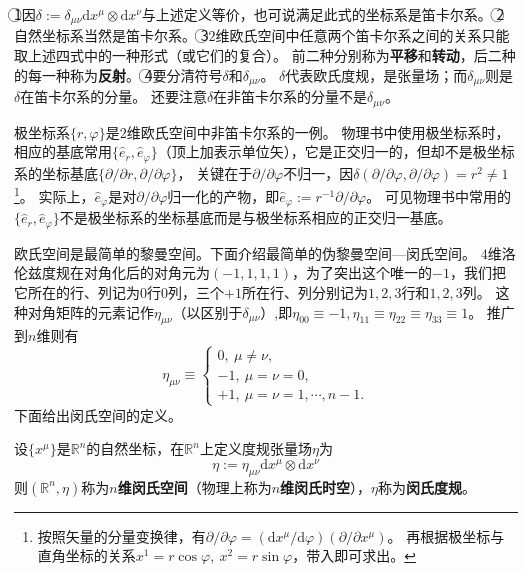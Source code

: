 \begin{note}
\textcircled{1}因$\delta := \delta_{\mu\nu}\mathrm{d}x^\mu\otimes\mathrm{d}x^\nu$与上述定义等价，也可说满足此式的坐标系是笛卡尔系。
\textcircled{2}自然坐标系当然是笛卡尔系。
\textcircled{3}$2$维欧氏空间中任意两个笛卡尔系之间的关系只能取上述四式中的一种形式（或它们的复合）。
前二种分别称为\textbf{平移}和\textbf{转动}，后二种的每一种称为\textbf{反射}。
\textcircled{4}要分清符号$\delta$和$\delta_{\mu\nu}$。
$\delta$代表欧氏度规，是张量场；而$\delta_{\mu\nu}$则是$\delta$在笛卡尔系的分量。
还要注意$\delta$在非笛卡尔系的分量不是$\delta_{\mu\nu}$。
\end{note}

极坐标系$\{r, \varphi\}$是$2$维欧氏空间中非笛卡尔系的一例。
物理书中使用极坐标系时，相应的基底常用$\{\hat{e}_r, \hat{e}_\varphi\}$（顶上加$\hat{}$表示单位矢），它是正交归一的，但却不是极坐标系的坐标基底$\{\partial / \partial r, \partial / \partial\varphi\}$，
关键在于$\partial / \partial\varphi$不归一，因$\delta(\partial / \partial\varphi, \partial / \partial\varphi) = r^2 \neq 1$\footnote{
按照矢量的分量变换律，有$\partial / \partial\varphi = (\mathrm{d}x^\mu / \mathrm{d}\varphi)(\partial / \partial x^\mu)$。
再根据极坐标与直角坐标的关系$x^1 = r\cos\varphi, ~ x^2 = r\sin\varphi$，带入即可求出。
}。
实际上，$\hat{e}_\varphi$是对$\partial / \partial\varphi$归一化的产物，即$\hat{e}_\varphi := r^{-1}\partial / \partial\varphi$。
可见物理书中常用的$\{\hat{e}_r, \hat{e}_\varphi\}$不是极坐标系的坐标基底而是与极坐标系相应的正交归一基底。

欧氏空间是最简单的黎曼空间。下面介绍最简单的伪黎曼空间---闵氏空间。
$4$维洛伦兹度规在对角化后的对角元为$(-1, 1, 1, 1)$，为了突出这个唯一的$-1$，我们把它所在的行、列记为$0$行$0$列，三个$+1$所在行、列分别记为$1, 2, 3$行和$1, 2, 3$列。
这种对角矩阵的元素记作$\eta_{\mu\nu}$（以区别于$\delta_{\mu\nu}$）,即$\eta_{00} \equiv -1, \eta_{11} \equiv \eta_{22} \equiv \eta_{33} \equiv 1$。
推广到$n$维则有
$$
\eta_{\mu\nu} \equiv
\begin{cases}
0, ~ \mu \neq \nu, \\
-1, ~ \mu = \nu = 0, \\
+1, ~ \mu = \nu = 1, \cdots, n -1.
\end{cases}
$$
下面给出闵氏空间的定义。

\begin{definition}
设$\{x^\mu\}$是$\mathbb{R}^n$的自然坐标，在$\mathbb{R}^n$上定义度规张量场$\eta$为
$$\eta := \eta_{\mu\nu}\mathrm{d}x^\mu\otimes\mathrm{d}x^\nu$$
则$(\mathbb{R}^n, \eta)$称为\textbf{$n$维闵氏空间}（物理上称为\textbf{$n$维闵氏时空}），$\eta$称为\textbf{闵氏度规}。
\end{definition}

